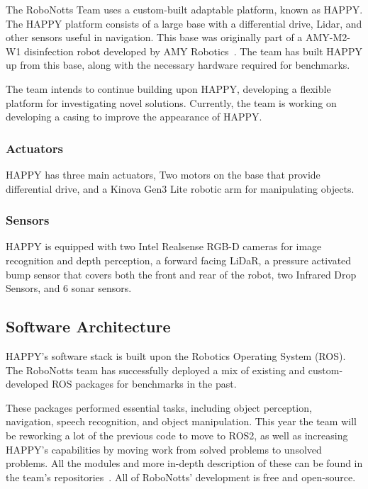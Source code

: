 The RoboNotts Team uses a custom-built adaptable platform, known as HAPPY. The HAPPY platform consists of a large base with a differential drive, Lidar, and other sensors useful in navigation. This base was originally part of a AMY-M2-W1 disinfection robot developed by AMY Robotics~\cite{ref_url2}. The team has built HAPPY up from this base, along with the necessary hardware required for benchmarks.

The team intends to continue building upon HAPPY, developing a flexible platform for investigating novel solutions. Currently, the team is working on developing a casing to improve the appearance of HAPPY.

\subsubsection{Actuators}

HAPPY has three main actuators, Two motors on the base that provide differential drive, and a Kinova Gen3 Lite robotic arm for manipulating objects.

\subsubsection{Sensors}

HAPPY is equipped with two Intel Realsense RGB-D cameras for image recognition and depth perception, a forward facing LiDaR, a pressure activated bump sensor that covers both the front and rear of the robot, two Infrared Drop Sensors, and 6 sonar sensors.

\subsection{Software Architecture}

HAPPY's software stack is built upon the Robotics Operating System (ROS). The RoboNotts team has successfully deployed a mix of existing and custom-developed ROS packages for benchmarks in the past.

These packages performed essential tasks, including object perception, navigation, speech recognition, and object manipulation. This year the team will be reworking a lot of the previous code to move to ROS2, as well as increasing HAPPY's capabilities by moving work from solved problems to unsolved problems. All the modules and more in-depth description of these can be found in the team's repositories~\cite{ref_git}. All of RoboNotts' development is free and open-source.

